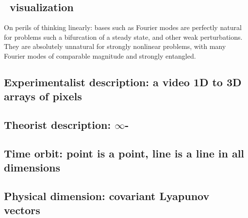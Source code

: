 \subsection{\Statesp\ visualization}

On perils of thinking linearly: bases such as Fourier modes are
perfectly natural for problems such a bifurcation of a steady state, and
other weak perturbations. They are absolutely unnatural for strongly
nonlinear problems, with many Fourier modes of comparable magnitude and
strongly entangled.

\subsection{\CLe}
\subsection{Experimentalist description: a video 1D to 3D arrays of pixels}
\subsection{Theorist description: $\infty$-\dmn\ \statesp}
\subsection{Time orbit: point is a point, line is a line in all dimensions}
\label{sect:TimeOrb}

\subsection{Physical dimension: covariant Lyapunov vectors}
